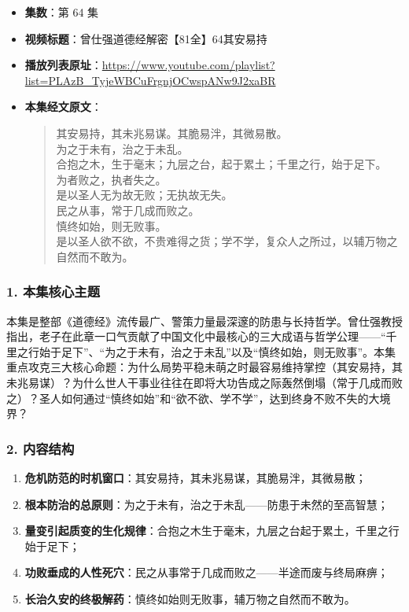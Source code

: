 \begin{itemize}
    \item \textbf{集数}：第 64 集
    \item \textbf{视频标题}：曾仕强道德经解密【81全】64其安易持
    \item \textbf{播放列表原址}：\url{https://www.youtube.com/playlist?list=PLAzB_TyjeWBCuFrgnjOCwspANw9J2xaBR}
    \item \textbf{本集经文原文}：
    \begin{quote}\kaishu
    其安易持，其未兆易谋。其脆易泮，其微易散。\\
    为之于未有，治之于未乱。\\
    合抱之木，生于毫末；九层之台，起于累土；千里之行，始于足下。\\
    为者败之，执者失之。\\
    是以圣人无为故无败；无执故无失。\\
    民之从事，常于几成而败之。\\
    慎终如始，则无败事。\\
    是以圣人欲不欲，不贵难得之货；学不学，复众人之所过，以辅万物之自然而不敢为。
    \end{quote}
\end{itemize}

\subsubsection{1. 本集核心主题}
本集是整部《道德经》流传最广、警策力量最深邃的防患与长持哲学。曾仕强教授指出，老子在此章一口气贡献了中国文化中最核心的三大成语与哲学公理——“千里之行始于足下”、“为之于未有，治之于未乱”以及“慎终如始，则无败事”。本集重点攻克三大核心命题：为什么局势平稳未萌之时最容易维持掌控（其安易持，其未兆易谋）？为什么世人干事业往往在即将大功告成之际轰然倒塌（常于几成而败之）？圣人如何通过“慎终如始”和“欲不欲、学不学”，达到终身不败不失的大境界？

\subsubsection{2. 内容结构}
\begin{enumerate}
    \item \textbf{危机防范的时机窗口}：其安易持，其未兆易谋，其脆易泮，其微易散；
    \item \textbf{根本防治的总原则}：为之于未有，治之于未乱——防患于未然的至高智慧；
    \item \textbf{量变引起质变的生化规律}：合抱之木生于毫末，九层之台起于累土，千里之行始于足下；
    \item \textbf{功败垂成的人性死穴}：民之从事常于几成而败之——半途而废与终局麻痹；
    \item \textbf{长治久安的终极解药}：慎终如始则无败事，辅万物之自然而不敢为。
\end{enumerate}

